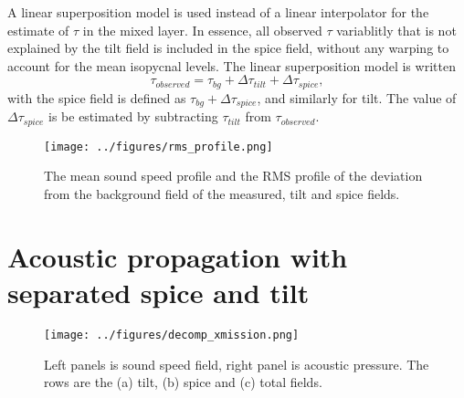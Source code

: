 \documentclass[preprint,NumberedRefs]{JASA}
\begin{document}
A linear superposition model is used instead of a linear interpolator for the estimate of $\tau$ in the mixed layer. In essence, all observed $\tau$ variablitly that is not explained by the tilt field is included in the spice field, without any warping to account for the mean isopycnal levels. The linear superposition model is written
\begin{equation}
    \tau_{observed} = \tau_{bg} + \Delta \tau_{tilt} + \Delta \tau_{spice},
\end{equation}
with the spice field is defined as $\tau_{bg} + \Delta \tau_{spice}$, and similarly for tilt. The value of $\Delta \tau_{spice}$ is be estimated by subtracting $\tau_{tilt}$ from $\tau_{observed}$.

\begin{figure}
\texttt{[image: ../figures/rms\_profile.png]}
    \caption{\label{fig:c_rms}{The mean sound speed profile and the RMS profile of the deviation from the background field of the measured, tilt and spice fields. }}
\end{figure}

\section{\label{sec:propagation}Acoustic propagation with separated spice and tilt}
\begin{figure}
\texttt{[image: ../figures/decomp\_xmission.png]}
    \caption{\label{fig:decomp_x}{Left panels is sound speed field, right panel is acoustic pressure. The rows are the (a) tilt, (b) spice and (c) total fields.}}
\end{figure}



\end{document}
